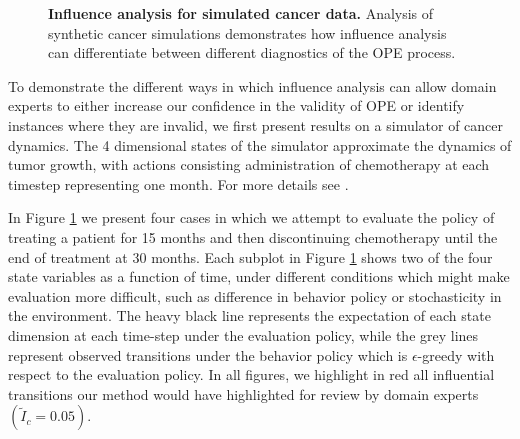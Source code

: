 \documentclass{article}
\begin{document}
\begin{figure}[t]
    \centering
    \caption{\textbf{Influence analysis for simulated cancer data.} Analysis of synthetic cancer simulations demonstrates how influence analysis can differentiate between different diagnostics of the OPE process.}
    \label{fig:cancer}
\end{figure}

To demonstrate the different ways in which influence analysis can allow domain experts to either increase our confidence in the validity of OPE or identify instances where they are invalid, we first present results on a simulator of cancer dynamics. The 4 dimensional states of the simulator approximate the dynamics of tumor growth, with actions consisting administration of chemotherapy at each timestep representing one month. For more details see \citet{ribba2012tumor}.

In Figure \ref{fig:cancer} we present four cases in which we attempt to evaluate the policy of treating a patient for 15 months and then discontinuing chemotherapy until the end of treatment at 30 months. Each subplot in Figure \ref{fig:cancer} shows two of the four state variables as a function of time, under different conditions which might make evaluation more difficult, such as difference in behavior policy or stochasticity in the environment. The heavy black line represents the expectation of each state dimension at each time-step under the evaluation policy, while the grey lines represent observed transitions under the behavior policy which is $\epsilon$-greedy with respect to the evaluation policy. In all figures, we highlight in red all influential transitions our method would have highlighted for review by domain experts $(\tilde{I}_c = 0.05)$.
\end{document}
